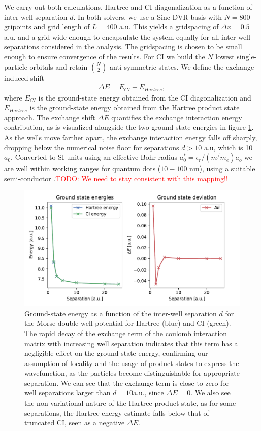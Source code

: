 \documentclass{subfiles}
\begin{document}
We carry out both calculations, Hartree and CI diagonalization as a function of inter-well separation $d$. In both solvers, we use a Sinc-DVR basis with $N=800$ gripoints and  grid length of $L=400$ a.u. This yields a gridspacing of $\Delta x = 0.5$ a.u. and a grid wide enough to encapsulate the system equally for all inter-well separations considered in the analysis. The gridspacing is chosen to be small enough to ensure convergence of the results. For CI we build the $N$ lowest single-particle orbitals and retain $\binom{N}{2}$ anti-symmetric states. We define the exchange-induced shift
\begin{align*}
    \Delta E = E_{CI} - E_{Hartree},
\end{align*}
where $E_{CI}$ is the ground-state energy obtained from the CI diagonalization and $E_{Hartree}$ is the ground-state energy obtained from the Hartree product state approach. The exchange shift $\Delta E$ quantifies the exchange interaction energy contribution, as is visualized alongside the two ground-state energies in figure \ref{fig:exchange_shift}. As the wells move farther apart, the exchange interaction energy falls off sharply, dropping below the numerical noise floor for separations $d > 10$ a.u, which is 10 $a_0$. Converted to SI units using an effective Bohr radius $a_0^* = \epsilon_r/(m^/m_e)a_o$ we are well within working ranges for quantum dots ($10-100$ nm), using a suitable semi-conductor \cite{jacak2013quantum, garcia2021semiconductor}.\textcolor{red}{TODO: We need to stay consistent with this mapping!!}
\begin{figure}[h!]
    \centering
    \includegraphics[width=1.0\textwidth]{figs/exchange_shift.pdf}
    \caption{Ground-state energy as a function of the inter-well separation $d$ for the Morse double-well potential for Hartree (blue) and CI (green). The rapid decay of the exchange term of the coulomb interaction matrix with increasing well separation indicates that this term has a negligible effect on the ground state energy, confirming our assumption of locality and the usage of product states to express the wavefunction, as the particles become distinguishable for appropriate separation. We can see that the exchange term is close to zero for well separations larger than $d = 10$a.u., since $\Delta E=0$. We also see the non-variational nature of the Hartree product state, as for some separations, the Hartree energy estimate falls below that of truncated CI, seen as a negative $\Delta E$.}
    \label{fig:exchange_shift}
\end{figure}
\end{document}
